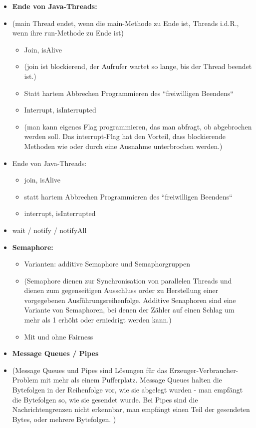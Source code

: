 \begin{itemize}
        \item \textbf{Ende von Java-Threads:}
        \item[] (main Thread endet, wenn die main-Methode zu Ende ist, Threads i.d.R., wenn ihre run-Methode zu Ende ist)
        \begin{itemize}
            \item Join, isAlive
            \item[] (join ist blockierend, der Aufrufer wartet so lange, bis der Thread beendet ist.)
            \item Statt hartem Abbrechen Programmieren des ``freiwilligen Beendens``
            \item Interrupt, isInterrupted
            \item[] (man kann eigenes Flag programmieren, das man abfragt, ob abgebrochen werden soll. Das interrupt-Flag hat den Vorteil, dass blockierende Methoden wie  oder  durch eine Ausnahme unterbrochen werden.)
        \end{itemize}

        \item Ende von Java-Threads:
        \begin{itemize}
            \item join, isAlive
            \item statt hartem Abbrechen Programmieren des ``freiwilligen Beendens``
            \item interrupt, isInterrupted
        \end{itemize}
        \item wait / notify / notifyAll

        \item \textbf{Semaphore:}
        \begin{itemize}
            \item Varianten: additive Semaphore und Semaphorgruppen
            \item[] (Semaphore dienen zur Synchronisation von parallelen Threads und dienen zum gegenseitigen Ausschluss order zu Herstellung einer vorgegebenen Ausführungsreihenfolge. Additive Senaphoren sind eine Variante von Semaphoren, bei denen der Zähler auf einen Schlag um mehr als 1 erhöht oder erniedrigt werden kann.)
            \item Mit und ohne Fairness
        \end{itemize}

        \item \textbf{Message Queues / Pipes}
        \item[] (Message Queues und Pipes sind Lösungen für das Erzeuger-Verbraucher-Problem mit mehr als einem Pufferplatz. Message Queues halten die Bytefolgen in der Reihenfolge vor, wie sie abgelegt wurden - man empfängt die Bytefolgen so, wie sie gesendet wurde. Bei Pipes sind die Nachrichtengrenzen nicht erkennbar, man empfängt einen Teil der gesendeten Bytes, oder mehrere Bytefolgen. )


\end{itemize}
